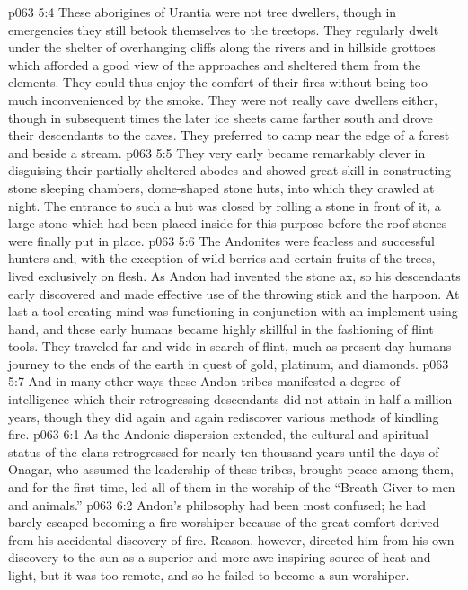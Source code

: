 \vs p063 5:4 These aborigines of Urantia were not tree dwellers, though in emergencies they still betook themselves to the treetops. They regularly dwelt under the shelter of overhanging cliffs along the rivers and in hillside grottoes which afforded a good view of the approaches and sheltered them from the elements. They could thus enjoy the comfort of their fires without being too much inconvenienced by the smoke. They were not really cave dwellers either, though in subsequent times the later ice sheets came farther south and drove their descendants to the caves. They preferred to camp near the edge of a forest and beside a stream.
\vs p063 5:5 They very early became remarkably clever in disguising their partially sheltered abodes and showed great skill in constructing stone sleeping chambers, dome\hyp{}shaped stone huts, into which they crawled at night. The entrance to such a hut was closed by rolling a stone in front of it, a large stone which had been placed inside for this purpose before the roof stones were finally put in place.
\vs p063 5:6 The Andonites were fearless and successful hunters and, with the exception of wild berries and certain fruits of the trees, lived exclusively on flesh. As Andon had invented the stone ax, so his descendants early discovered and made effective use of the throwing stick and the harpoon. At last a tool\hyp{}creating mind was functioning in conjunction with an implement\hyp{}using hand, and these early humans became highly skillful in the fashioning of flint tools. They traveled far and wide in search of flint, much as present\hyp{}day humans journey to the ends of the earth in quest of gold, platinum, and diamonds.
\vs p063 5:7 And in many other ways these Andon tribes manifested a degree of intelligence which their retrogressing descendants did not attain in half a million years, though they did again and again rediscover various methods of kindling fire.\plusone
{}
\vs p063 6:1 As the Andonic dispersion extended, the cultural and spiritual status of the clans retrogressed for nearly ten thousand years until the days of Onagar, who assumed the leadership of these tribes, brought peace among them, and for the first time, led all of them in the worship of the “Breath Giver to men and animals.”
\pc \vs p063 6:2 Andon’s philosophy had been most confused; he had barely escaped becoming a fire worshiper because of the great comfort derived from his accidental discovery of fire. Reason, however, directed him from his own discovery to the sun as a superior and more awe\hyp{}inspiring source of heat and light, but it was too remote, and so he failed to become a sun worshiper.
